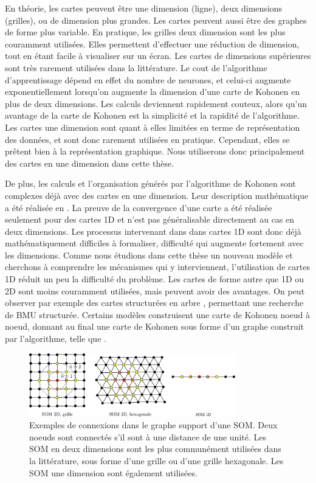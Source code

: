 \documentclass[../main]{subfiles}
\begin{document}
En théorie, les cartes peuvent être une dimension (ligne), deux dimensions (grilles), ou de dimension plus grandes. Les cartes peuvent aussi être des graphes de forme plus variable. En pratique, les grilles deux dimension sont les plus couramment utilisées. Elles permettent d'effectuer une réduction de dimension, tout en étant facile à visualiser sur un écran. Les cartes de dimensions supérieures sont très rarement utilisées dans la littérature. Le cout de l'algorithme d'apprentissage dépend en effet du nombre de neurones, et celui-ci augmente exponentiellement lorsqu'on augmente la dimension d'une carte de Kohonen en plus de deux dimensions. Les calculs deviennent rapidement couteux, alors qu'un avantage de la carte de Kohonen est la simplicité et la rapidité de l'algorithme. Les cartes une dimension sont quant à elles limitées en terme de représentation des données, et sont donc rarement utilisées en pratique. Cependant, elles se prêtent bien à la représentation graphique. Nous utiliserons donc principalement des cartes en une dimension dans cette thèse.


De plus, les calculs et l'organisation générés par l'algorithme de Kohonen sont complexes déjà avec des cartes en une dimension. Leur description mathématique a été réalisée en \cite{cottrell_theoretical_2016,cottrell_theoretical_1998,fort_soms_2006}. La preuve de la convergence d'une carte a été réalisée seulement pour des cartes 1D et n'est pas généralisable directement au cas en deux dimensions. Les processus intervenant dans dans cartes 1D sont donc déjà mathématiquement difficiles à formaliser, difficulté qui augmente fortement avec les dimensions. Comme nous étudions dans cette thèse un nouveau modèle et cherchons à comprendre les mécanismes qui y interviennent, l'utilisation de cartes 1D réduit un peu la difficulté du problème. 
Les cartes de forme autre que 1D ou 2D sont moins couramment utilisées, mais peuvent avoir des avantages. On peut observer par exemple des cartes structurées en arbre \cite{koikkalainen_self-organizing_1990}, permettant une recherche de BMU structurée. Certains modèles construisent une carte de Kohonen noeud à noeud, donnant au final une carte de Kohonen sous forme d'un graphe construit par l'algorithme, telle que \cite{alahakoon_dynamic_2000}. 
\begin{figure}
\centering
\includegraphics[width=0.8\textwidth]{soms_topologies}
\caption{Exemples de connexions dans le graphe support d'une SOM. Deux noeuds sont connectés s'il sont à une distance de une unité. Les SOM en deux dimensions sont les plus communément utilisées dans la littérature, sous forme d'une grille ou d'une grille hexagonale. Les SOM une dimension sont également utilisées.}
\label{fig:topo}
\end{figure}
\end{document}
